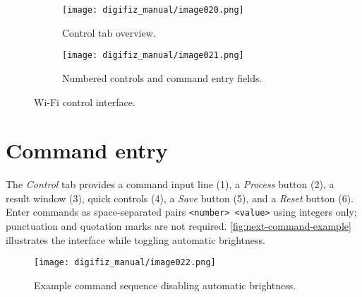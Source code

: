 \begin{figure}[htbp]
    \centering
    \begin{subfigure}{0.48\textwidth}
        \texttt{[image: digifiz\_manual/image020.png]}
        \caption{Control tab overview.}
    \end{subfigure}\hfill
    \begin{subfigure}{0.48\textwidth}
        \texttt{[image: digifiz\_manual/image021.png]}
        \caption{Numbered controls and command entry fields.}
    \end{subfigure}
    \caption{\ReplicaNextShort{} Wi-Fi control interface.}
    \label{fig:next-control-tabs}
\end{figure}

\section{Command entry}
The \emph{Control} tab provides a command input line (1), a \emph{Process} button (2), a result window (3), quick controls (4), a \emph{Save} button (5), and a \emph{Reset} button (6). Enter commands as space-separated pairs \verb|<number> <value>| using integers only; punctuation and quotation marks are not required. \autoref{fig:next-command-example} illustrates the interface while toggling automatic brightness.

\begin{figure}[htbp]
    \centering
    \texttt{[image: digifiz\_manual/image022.png]}
    \caption{Example command sequence disabling automatic brightness.}
    \label{fig:next-command-example}
\end{figure}

